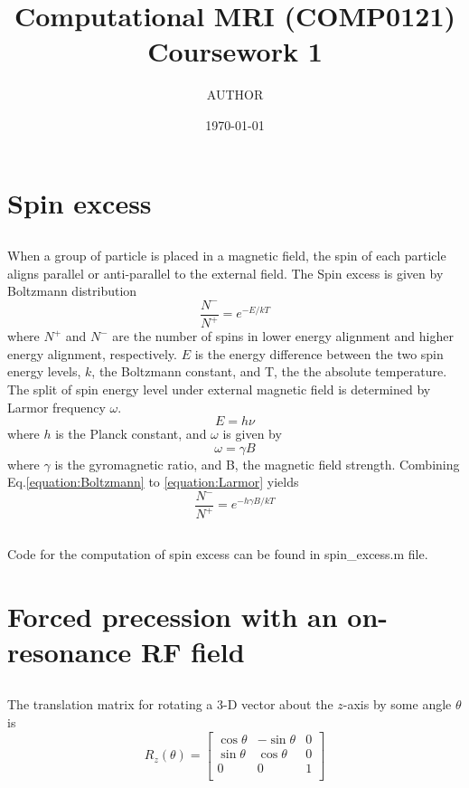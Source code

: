 \documentclass[a4paper,11pt]{article}
\begin{document}
\author{AUTHOR}
\title{Computational MRI (COMP0121) Coursework 1}
\date{\today}
\maketitle

\section{Spin excess}
\subsection{}
When a group of particle is placed in a magnetic field, the spin of each particle aligns parallel or anti-parallel to the external field.
The Spin excess is given by Boltzmann distribution
\begin{equation}
    \frac{N^-}{N^+} = e^{-E/kT}
    \label{equation:Boltzmann}
\end{equation}
where $N^+$ and $N^-$ are the number of spins in lower energy alignment and higher energy alignment, respectively. 
$E$ is the energy difference between the two spin energy levels, $k$, the Boltzmann constant, and T, the the absolute temperature.
The split of spin energy level under external magnetic field is determined by Larmor frequency $\omega$.
\begin{equation}
    E = h \nu
    \label{equation:photon_energy}
\end{equation}
where $h$ is the Planck constant, and $\omega$ is given by
\begin{equation}
    \omega = \gamma B
    \label{equation:Larmor}
\end{equation}
where $\gamma$ is the gyromagnetic ratio, and B, the magnetic field strength.
Combining Eq.\ref{equation:Boltzmann} to \ref{equation:Larmor} yields
\begin{equation}
    \frac{N^-}{N^+} = e^{-h\gamma B/kT}
\end{equation}

\subsection{}
Code for the computation of spin excess can be found in spin\_excess.m file. 

\section{Forced precession with an on-resonance RF field}
\subsection{}
The translation matrix for rotating a 3-D vector about the $z$-axis by some angle $\theta$ is
\begin{equation}
    R_z(\theta) = 
    \begin{bmatrix}
        \cos \theta & -\sin \theta  & 0 \\
        \sin \theta & \cos \theta & 0 \\
        0 & 0 & 1 \\
    \end{bmatrix}
\end{equation}
\end{document}
